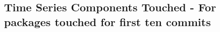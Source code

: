 \subsection{Time Series Components Touched - \label{subsec:codebase_graph_latex.repository_graph.component_time_series.time_series_components_touched_packages_first ten commits} 
For packages touched for first ten commits} 


\clearpage
